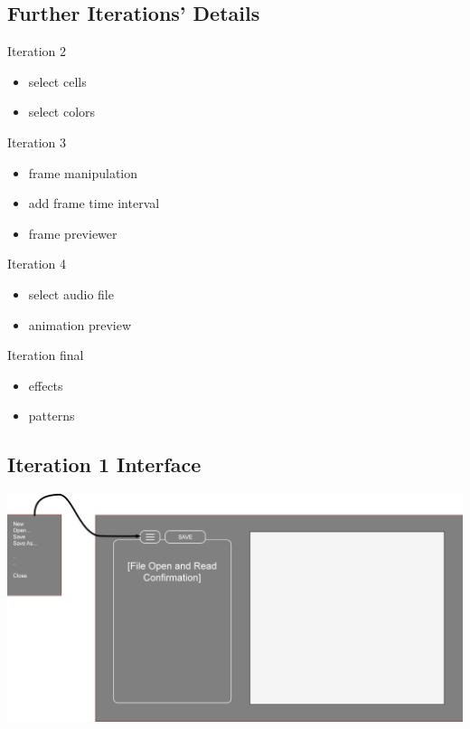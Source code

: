 \documentclass[12pt]{article}
\begin{document}
\subsection*{Further Iterations' Details}
Iteration 2\par
\noindent
\begin{itemize}
\item{select cells}
\item{select colors}
\end{itemize}
Iteration 3\par
\noindent
\begin{itemize}
\item{frame manipulation}
\item{add frame time interval}
\item{frame previewer}
\end{itemize}
Iteration 4\par
\noindent
\begin{itemize}
\item{select audio file}
\item{animation preview}
\end{itemize}
Iteration final\par
\noindent
\begin{itemize}
\item{effects}
\item{patterns}
\end{itemize}
\subsection*{Iteration 1 Interface}
\includegraphics[scale=.25]{CS336-Project01-UI-Week1_Target.png}
\end{document}
